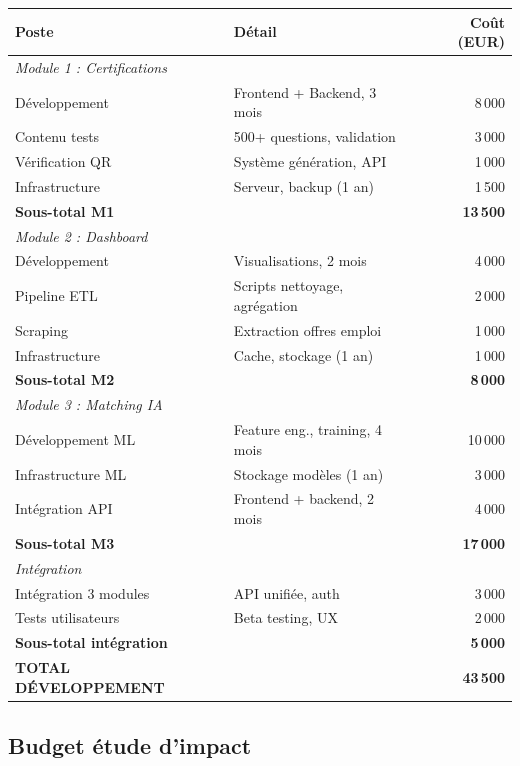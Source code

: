 \documentclass[12pt]{article}
\begin{document}
\begin{table}[h]
\centering
\begin{tabular}{lp{6cm}r}
\toprule
\textbf{Poste} & \textbf{Détail} & \textbf{Coût (EUR)} \\
\midrule
\multicolumn{3}{l}{\textit{Module 1 : Certifications}} \\
Développement & Frontend + Backend, 3 mois & 8\,000 \\
Contenu tests & 500+ questions, validation & 3\,000 \\
Vérification QR & Système génération, API & 1\,000 \\
Infrastructure & Serveur, backup (1 an) & 1\,500 \\
\textbf{Sous-total M1} & & \textbf{13\,500} \\
\midrule
\multicolumn{3}{l}{\textit{Module 2 : Dashboard}} \\
Développement & Visualisations, 2 mois & 4\,000 \\
Pipeline ETL & Scripts nettoyage, agrégation & 2\,000 \\
Scraping & Extraction offres emploi & 1\,000 \\
Infrastructure & Cache, stockage (1 an) & 1\,000 \\
\textbf{Sous-total M2} & & \textbf{8\,000} \\
\midrule
\multicolumn{3}{l}{\textit{Module 3 : Matching IA}} \\
Développement ML & Feature eng., training, 4 mois & 10\,000 \\
Infrastructure ML & Stockage modèles (1 an) & 3\,000 \\
Intégration API & Frontend + backend, 2 mois & 4\,000 \\
\textbf{Sous-total M3} & & \textbf{17\,000} \\
\midrule
\multicolumn{3}{l}{\textit{Intégration}} \\
Intégration 3 modules & API unifiée, auth & 3\,000 \\
Tests utilisateurs & Beta testing, UX & 2\,000 \\
\textbf{Sous-total intégration} & & \textbf{5\,000} \\
\midrule
\textbf{TOTAL DÉVELOPPEMENT} & & \textbf{43\,500} \\
\bottomrule
\end{tabular}
\end{table}

\subsection{Budget étude d'impact}
\end{document}
